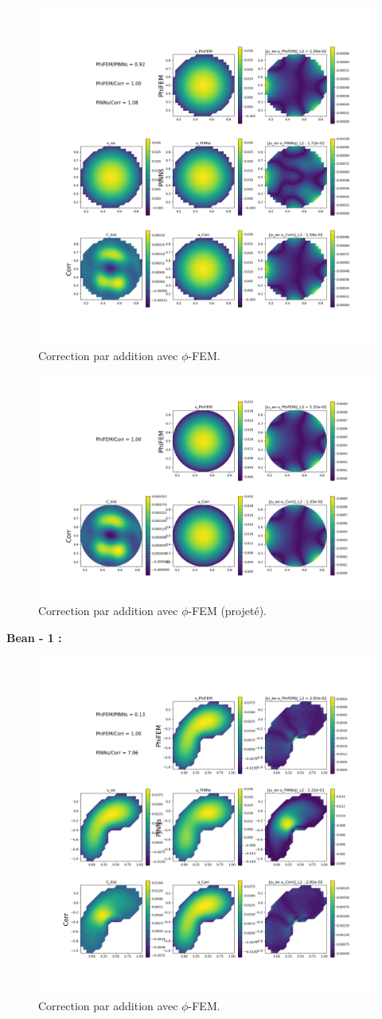 \documentclass[french]{article}
\begin{document}
	\begin{figure}[H]
		\centering
		\includegraphics[width=0.6\linewidth]{"correction/circle/corr_PhiFEM.png"}
		\caption{Correction par addition avec $\phi$-FEM.}
	\end{figure}

	\begin{figure}[H]
		\centering
		\includegraphics[width=0.6\linewidth]{"correction/circle/corr_PhiFEM_Omega.png"}
		\caption{Correction par addition avec $\phi$-FEM (projeté).}
	\end{figure}
	
	\newpage
	\textbf{Bean - 1 :}
	
	\begin{figure}[H]
		\centering
		\includegraphics[width=0.6\linewidth]{"correction/bean/corr_PhiFEM_1.png"}
		\caption{Correction par addition avec $\phi$-FEM.}
	\end{figure}
	
\end{document}
